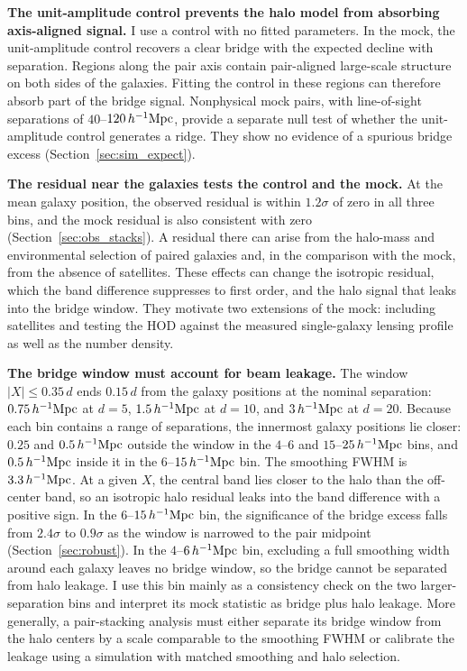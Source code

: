 \documentclass[11pt,letterpaper]{article}
\newcommand{\hinvMpc}{h^{-1}{\rm Mpc}}
\begin{document}
\textbf{The unit-amplitude control prevents the halo model from absorbing
axis-aligned signal.}
I use a control with no fitted parameters. In the mock, the unit-amplitude
control recovers a clear bridge with the expected decline with separation.
Regions along the pair axis contain pair-aligned large-scale structure on both
sides of the galaxies. Fitting the control in these regions can therefore
absorb part of the bridge signal. Nonphysical mock pairs, with
line-of-sight separations of
$40$--$120\,\hinvMpc$, provide a separate null test of whether the
unit-amplitude control generates a ridge. They show no evidence of a spurious
bridge excess (Section~\ref{sec:sim_expect}).

\textbf{The residual near the galaxies tests the control and the mock.}
At the mean galaxy position, the observed residual is within $1.2\sigma$ of
zero in all three bins, and the mock residual is also consistent with zero
(Section~\ref{sec:obs_stacks}).
A residual there can arise from the halo-mass and environmental selection of
paired galaxies and, in the comparison with the mock, from the absence of
satellites. These effects can change the isotropic residual, which the band difference
suppresses to first order, and the halo signal that leaks
into the bridge window. They motivate two extensions of the mock: including
satellites and testing the HOD against the measured single-galaxy lensing
profile as well as the number density.

\textbf{The bridge window must account for beam leakage.} The window
$|X|\leq0.35\,d$ ends $0.15\,d$ from the galaxy positions at the nominal
separation: $0.75\,\hinvMpc$ at
$d=5$, $1.5\,\hinvMpc$ at $d=10$, and $3\,\hinvMpc$ at $d=20$. Because each
bin contains a range of separations, the innermost galaxy positions lie
closer: $0.25$ and $0.5\,\hinvMpc$ outside the window in the $4$--$6$ and
$15$--$25\,\hinvMpc$ bins, and $0.5\,\hinvMpc$ inside it in the
$6$--$15\,\hinvMpc$ bin. The smoothing
FWHM is $3.3\,\hinvMpc$. At a given $X$, the central band lies closer to the
halo than the off-center band, so an isotropic
halo residual leaks into the band difference with a positive sign. In the
$6$--$15\,\hinvMpc$ bin, the significance of the bridge excess falls from
$2.4\sigma$ to $0.9\sigma$ as the window is narrowed to the pair midpoint
(Section~\ref{sec:robust}).
In the $4$--$6\,\hinvMpc$ bin, excluding a full smoothing width around each galaxy leaves
no bridge window, so the bridge cannot be separated from halo leakage. I use
this bin mainly as a consistency check on the two larger-separation bins and
interpret its mock statistic as bridge plus halo leakage.
More generally, a pair-stacking analysis must either separate its bridge
window from the halo centers by a scale comparable to the smoothing FWHM or
calibrate the leakage using a simulation with matched smoothing and halo
selection.
\end{document}
